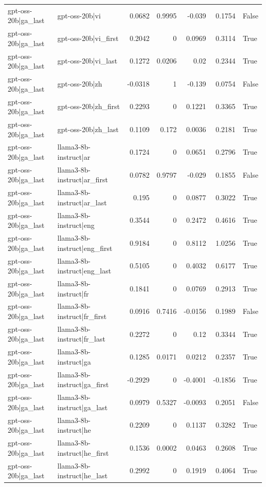 \begin{table}
\begin{tabular}{l l r r r r l}
gpt-oss-20b|ga_last & gpt-oss-20b|vi & 0.0682 & 0.9995 & -0.039 & 0.1754 & False \\
gpt-oss-20b|ga_last & gpt-oss-20b|vi_first & 0.2042 & 0 & 0.0969 & 0.3114 & True \\
gpt-oss-20b|ga_last & gpt-oss-20b|vi_last & 0.1272 & 0.0206 & 0.02 & 0.2344 & True \\
gpt-oss-20b|ga_last & gpt-oss-20b|zh & -0.0318 & 1 & -0.139 & 0.0754 & False \\
gpt-oss-20b|ga_last & gpt-oss-20b|zh_first & 0.2293 & 0 & 0.1221 & 0.3365 & True \\
gpt-oss-20b|ga_last & gpt-oss-20b|zh_last & 0.1109 & 0.172 & 0.0036 & 0.2181 & True \\
gpt-oss-20b|ga_last & llama3-8b-instruct|ar & 0.1724 & 0 & 0.0651 & 0.2796 & True \\
gpt-oss-20b|ga_last & llama3-8b-instruct|ar_first & 0.0782 & 0.9797 & -0.029 & 0.1855 & False \\
gpt-oss-20b|ga_last & llama3-8b-instruct|ar_last & 0.195 & 0 & 0.0877 & 0.3022 & True \\
gpt-oss-20b|ga_last & llama3-8b-instruct|eng & 0.3544 & 0 & 0.2472 & 0.4616 & True \\
gpt-oss-20b|ga_last & llama3-8b-instruct|eng_first & 0.9184 & 0 & 0.8112 & 1.0256 & True \\
gpt-oss-20b|ga_last & llama3-8b-instruct|eng_last & 0.5105 & 0 & 0.4032 & 0.6177 & True \\
gpt-oss-20b|ga_last & llama3-8b-instruct|fr & 0.1841 & 0 & 0.0769 & 0.2913 & True \\
gpt-oss-20b|ga_last & llama3-8b-instruct|fr_first & 0.0916 & 0.7416 & -0.0156 & 0.1989 & False \\
gpt-oss-20b|ga_last & llama3-8b-instruct|fr_last & 0.2272 & 0 & 0.12 & 0.3344 & True \\
gpt-oss-20b|ga_last & llama3-8b-instruct|ga & 0.1285 & 0.0171 & 0.0212 & 0.2357 & True \\
gpt-oss-20b|ga_last & llama3-8b-instruct|ga_first & -0.2929 & 0 & -0.4001 & -0.1856 & True \\
gpt-oss-20b|ga_last & llama3-8b-instruct|ga_last & 0.0979 & 0.5327 & -0.0093 & 0.2051 & False \\
gpt-oss-20b|ga_last & llama3-8b-instruct|he & 0.2209 & 0 & 0.1137 & 0.3282 & True \\
gpt-oss-20b|ga_last & llama3-8b-instruct|he_first & 0.1536 & 0.0002 & 0.0463 & 0.2608 & True \\
gpt-oss-20b|ga_last & llama3-8b-instruct|he_last & 0.2992 & 0 & 0.1919 & 0.4064 & True \\

\end{tabular}
\end{table}
